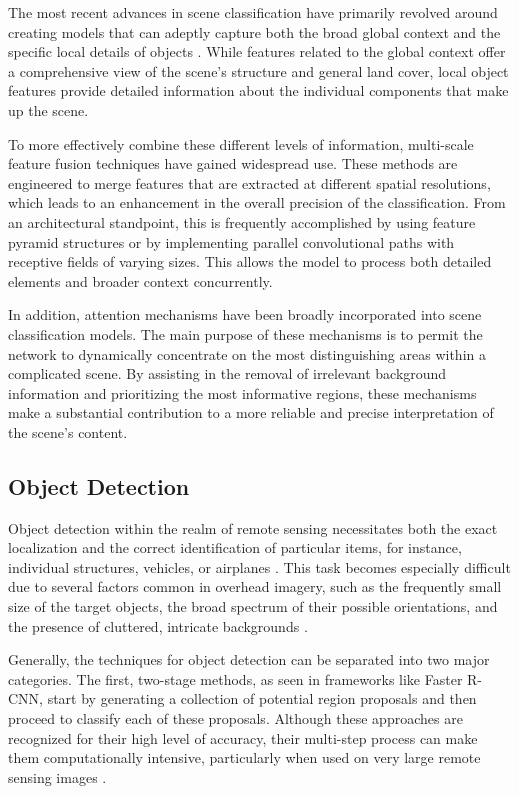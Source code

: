 \documentclass[12pt,a4paper]{article}
\begin{document}
The most recent advances in scene classification have primarily revolved around creating models that can adeptly capture both the broad global context and the specific local details of objects \cite{zeng2018improving}. While features related to the global context offer a comprehensive view of the scene's structure and general land cover, local object features provide detailed information about the individual components that make up the scene.

To more effectively combine these different levels of information, multi-scale feature fusion techniques have gained widespread use. These methods are engineered to merge features that are extracted at different spatial resolutions, which leads to an enhancement in the overall precision of the classification. From an architectural standpoint, this is frequently accomplished by using feature pyramid structures or by implementing parallel convolutional paths with receptive fields of varying sizes. This allows the model to process both detailed elements and broader context concurrently.

In addition, attention mechanisms have been broadly incorporated into scene classification models. The main purpose of these mechanisms is to permit the network to dynamically concentrate on the most distinguishing areas within a complicated scene. By assisting in the removal of irrelevant background information and prioritizing the most informative regions, these mechanisms make a substantial contribution to a more reliable and precise interpretation of the scene's content.

\subsection{Object Detection}
Object detection within the realm of remote sensing necessitates both the exact localization and the correct identification of particular items, for instance, individual structures, vehicles, or airplanes \cite{cheng2016survey}. This task becomes especially difficult due to several factors common in overhead imagery, such as the frequently small size of the target objects, the broad spectrum of their possible orientations, and the presence of cluttered, intricate backgrounds \cite{zhang2016weakly}.

Generally, the techniques for object detection can be separated into two major categories. The first, two-stage methods, as seen in frameworks like Faster R-CNN, start by generating a collection of potential region proposals and then proceed to classify each of these proposals. Although these approaches are recognized for their high level of accuracy, their multi-step process can make them computationally intensive, particularly when used on very large remote sensing images \cite{deng2017enhanced}.
\end{document}
